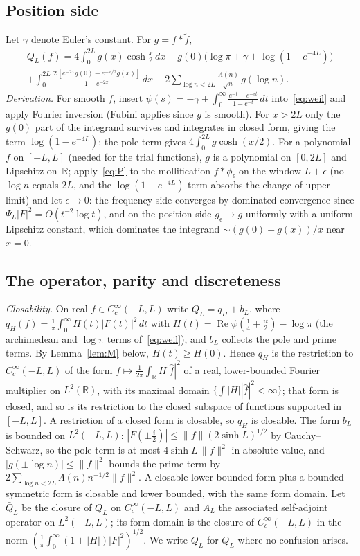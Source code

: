 \documentclass[11pt]{amsart}
\newcommand{\R}{\mathbb{R}}
\newcommand{\re}{\operatorname{Re}}
\theoremstyle{definition}
\theoremstyle{remark}
\numberwithin{equation}{section}
\begin{document}
\subsection{Position side}
Let $\gamma$ denote Euler's constant. For $g=f*\tilde f$,
\begin{multline}\label{eq:P}
Q_L(f)=4\int_0^{2L}g(x)\cosh\tfrac x2\,dx-g(0)\bigl(\log\pi+\gamma+\log(1-e^{-4L})\bigr)\\
+\int_0^{2L}\frac{2\,[e^{-2x}g(0)-e^{-x/2}g(x)]}{1-e^{-2x}}\,dx-2\sum_{\log n<2L}\frac{\Lambda(n)}{\sqrt n}\,g(\log n).
\end{multline}
\emph{Derivation.} For smooth $f$, insert $\psi(s)=-\gamma+\int_0^\infty\frac{e^{-t}-e^{-st}}{1-e^{-t}}\,dt$ into~\eqref{eq:weil} and apply Fourier inversion (Fubini applies since $g$ is smooth). For $x>2L$ only the $g(0)$ part of the integrand survives and integrates in closed form, giving the term $\log(1-e^{-4L})$; the pole term gives $4\int_0^{2L}g\cosh(x/2)$. For a polynomial $f$ on $[-L,L]$ (needed for the trial functions), $g$ is a polynomial on $[0,2L]$ and Lipschitz on~$\R$; apply~\eqref{eq:P} to the mollification $f*\phi_\epsilon$ on the window $L+\epsilon$ (no $\log n$ equals $2L$, and the $\log(1-e^{-4L})$ term absorbs the change of upper limit) and let $\epsilon\to0$: the frequency side converges by dominated convergence since $\Psi_L|F|^2=O(t^{-2}\log t)$, and on the position side $g_\epsilon\to g$ uniformly with a uniform Lipschitz constant, which dominates the integrand $\sim(g(0)-g(x))/x$ near $x=0$.

\subsection{The operator, parity and discreteness}
\emph{Closability.} On real $f\in C_c^\infty(-L,L)$ write $Q_L=q_H+b_L$, where $q_H(f)=\frac1\pi\int_0^\infty H(t)|F(t)|^2\,dt$ with $H(t)=\re\psi(\tfrac14+\tfrac{it}2)-\log\pi$ (the archimedean and $\log\pi$ terms of~\eqref{eq:weil}), and $b_L$ collects the pole and prime terms. By Lemma~\ref{lem:M} below, $H(t)\ge H(0)$. Hence $q_H$ is the restriction to $C_c^\infty(-L,L)$ of the form $f\mapsto\frac1{2\pi}\int_\R H|\hat f|^2$ of a real, lower-bounded Fourier multiplier on $L^2(\R)$, with its maximal domain $\{\int|H||\hat f|^2<\infty\}$; that form is closed, and so is its restriction to the closed subspace of functions supported in $[-L,L]$. A restriction of a closed form is closable, so $q_H$ is closable. The form $b_L$ is bounded on $L^2(-L,L)$: $|F(\pm\tfrac i2)|\le\|f\|(2\sinh L)^{1/2}$ by Cauchy--Schwarz, so the pole term is at most $4\sinh L\,\|f\|^2$ in absolute value, and $|g(\pm\log n)|\le\|f\|^2$ bounds the prime term by $2\sum_{\log n<2L}\Lambda(n)n^{-1/2}\|f\|^2$. A closable lower-bounded form plus a bounded symmetric form is closable and lower bounded, with the same form domain. Let $\bar Q_L$ be the closure of $Q_L$ on $C_c^\infty(-L,L)$ and $A_L$ the associated self-adjoint operator on $L^2(-L,L)$; its form domain is the closure of $C_c^\infty(-L,L)$ in the norm $(\frac1\pi\int_0^\infty(1+|H|)|F|^2)^{1/2}$. We write $Q_L$ for $\bar Q_L$ where no confusion arises.
\end{document}
